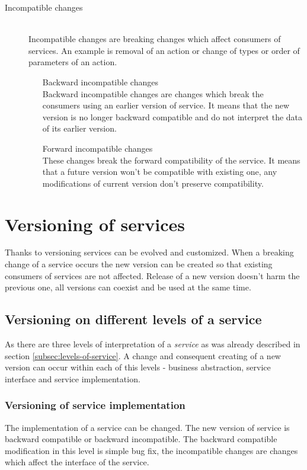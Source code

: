 \begin{description}
  \item[Incompatible changes] \hfill \\
  Incompatible changes are breaking changes which affect consumers of services. An example is removal of an action or change of types or order of parameters of an action.
  \begin{enumerate} 
    \item[Backward incompatible changes]  \hfill \\
    Backward incompatible changes are changes which break the consumers using an earlier version of service. It means that the new version is no longer backward compatible and do not interpret the data of its earlier version.
    \item[Forward incompatible changes] \hfill \\
    These changes break the forward compatibility of the service. It means that a future version won't be compatible with existing one, any modifications of current version don't preserve compatibility.
  \end{enumerate}
\end{description}

\section{Versioning of services}
\label{sec:verioningservices}
Thanks to versioning services can be evolved and customized. When a breaking change of a service occurs the new version can be created so that existing consumers of services are not affected. Release of a new version doesn't harm the previous one, all versions can coexist and be used at the same time. 

\subsection{Versioning on different levels of a service}
As there are three levels of interpretation of a \emph{service} as was already described in section \ref{subsec:levels-of-service}. A change and consequent creating of a new version can occur within each of this levels - business abstraction, service interface and service implementation.

\subsubsection{Versioning of service implementation}
The implementation of a service can be changed. The new version of service is backward compatible or backward incompatible. The backward compatible modification in this level is simple bug fix, the incompatible changes are changes which affect the interface of the service.

